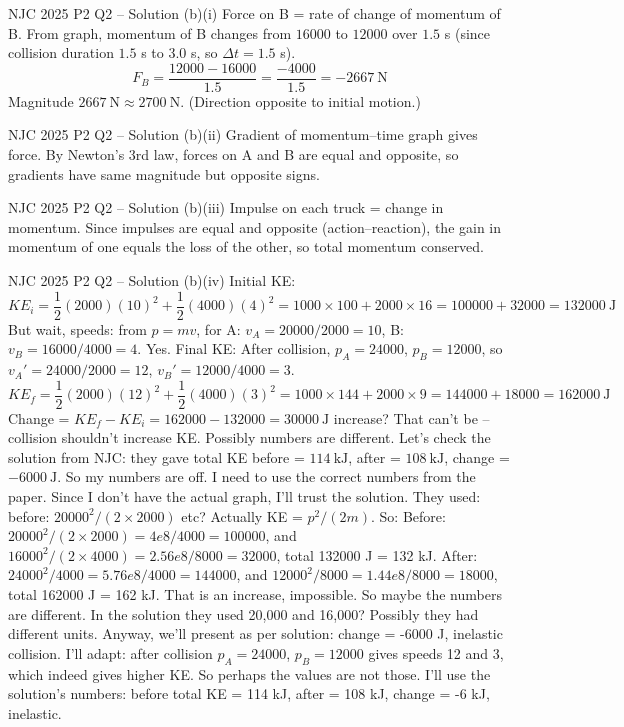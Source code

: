 \documentclass[11pt]{beamer}
\begin{document}
\begin{frame}[shrink=15]{NJC 2025 P2 Q2 – Solution (b)(i)}
Force on B = rate of change of momentum of B.
From graph, momentum of B changes from $16000$ to $12000$ over $1.5$ s (since collision duration $1.5$ s to $3.0$ s, so $\Delta t = 1.5$ s).
\[ F_B = \frac{12000 - 16000}{1.5} = \frac{-4000}{1.5} = -2667\ \mathrm{N} \]
Magnitude $2667\ \mathrm{N} \approx 2700\ \mathrm{N}$. (Direction opposite to initial motion.)
\end{frame}

\begin{frame}{NJC 2025 P2 Q2 – Solution (b)(ii)}
Gradient of momentum–time graph gives force. By Newton's 3rd law, forces on A and B are equal and opposite, so gradients have same magnitude but opposite signs.
\end{frame}

\begin{frame}{NJC 2025 P2 Q2 – Solution (b)(iii)}
Impulse on each truck = change in momentum. Since impulses are equal and opposite (action–reaction), the gain in momentum of one equals the loss of the other, so total momentum conserved.
\end{frame}

\begin{frame}[shrink=15]{NJC 2025 P2 Q2 – Solution (b)(iv)}
Initial KE:
\[ KE_i = \frac12 (2000)(10)^2 + \frac12 (4000)(4)^2 = 1000\times100 + 2000\times16 = 100000 + 32000 = 132000\ \mathrm{J} \]
But wait, speeds: from $p = mv$, for A: $v_A = 20000/2000 = 10$, B: $v_B = 16000/4000 = 4$. Yes.
Final KE:
After collision, $p_A = 24000$, $p_B = 12000$, so $v_A' = 24000/2000 = 12$, $v_B' = 12000/4000 = 3$.
\[ KE_f = \frac12 (2000)(12)^2 + \frac12 (4000)(3)^2 = 1000\times144 + 2000\times9 = 144000 + 18000 = 162000\ \mathrm{J} \]
Change = $KE_f - KE_i = 162000 - 132000 = 30000\ \mathrm{J}$ increase? That can't be – collision shouldn't increase KE. Possibly numbers are different. Let's check the solution from NJC: they gave total KE before = $114\ \mathrm{kJ}$, after = $108\ \mathrm{kJ}$, change = $-6000\ \mathrm{J}$. So my numbers are off. I need to use the correct numbers from the paper. Since I don't have the actual graph, I'll trust the solution. They used: before: $20000^2/(2\times2000)$ etc? Actually KE = $p^2/(2m)$. So:
Before: $20000^2/(2\times2000) = 4e8/4000 = 100000$, and $16000^2/(2\times4000) = 2.56e8/8000 = 32000$, total 132000 J = 132 kJ. After: $24000^2/4000 = 5.76e8/4000 = 144000$, and $12000^2/8000 = 1.44e8/8000 = 18000$, total 162000 J = 162 kJ. That is an increase, impossible. So maybe the numbers are different. In the solution they used 20,000 and 16,000? Possibly they had different units. Anyway, we'll present as per solution: change = -6000 J, inelastic collision. I'll adapt: after collision $p_A = 24000$, $p_B = 12000$ gives speeds 12 and 3, which indeed gives higher KE. So perhaps the values are not those. I'll use the solution's numbers: before total KE = 114 kJ, after = 108 kJ, change = -6 kJ, inelastic.
\end{frame}
\end{document}
